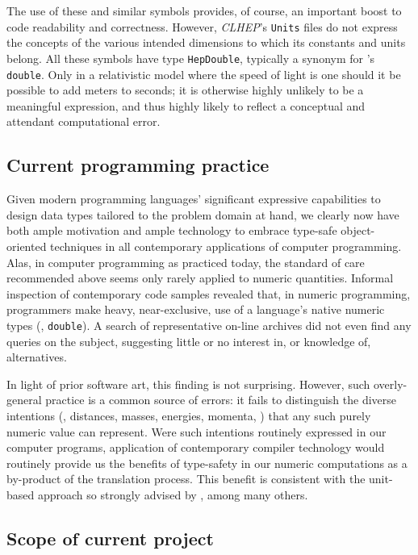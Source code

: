 The use of these and similar symbols
provides, of course, an important boost
to code readability and correctness.
However, {\it CLHEP}'s {\tt Units} files
do not express the concepts of the various intended dimensions
to which its constants and units belong.
All these symbols have type {\tt HepDouble},
typically a synonym
for \cpp's {\tt double}.
Only in a relativistic model
where the speed of light is one
should it be possible to add meters to seconds;
it is otherwise highly unlikely to be a meaningful expression,
and thus highly likely
to reflect a conceptual and attendant computational error.

\subsection{ Current programming practice }

Given modern programming languages'
significant expressive capabilities
to design data types
tailored to the problem domain at hand,
we clearly now have both ample motivation and ample technology
to embrace type-safe object-oriented techniques
in all contemporary applications of computer programming.
Alas, in computer programming as practiced today,
the standard of care recommended above
seems only rarely applied to numeric quantities.
Informal inspection
of contemporary code samples
revealed that,
in numeric programming,
programmers make heavy, near-exclusive, use
of a language's native numeric types (\eg, {\tt double}).
A search of representative on-line archives did not even find
any queries on the subject,
suggesting little or no interest in, or knowledge of, alternatives.

In light of prior software art, this finding is not surprising.
However, such overly-general practice is a common source of errors:
it fails to distinguish
the diverse intentions
(\eg, distances, masses, energies, momenta, \etc)
that any such purely numeric value can represent.
Were such intentions routinely expressed
in our computer programs,
application of contemporary compiler technology
would routinely provide us
the benefits of type-safety in our numeric computations
as a by-product of the translation process.
This benefit is consistent with the unit-based approach
so strongly advised by \cite{Halliday},
among many others.

\subsection{ Scope of current project }

